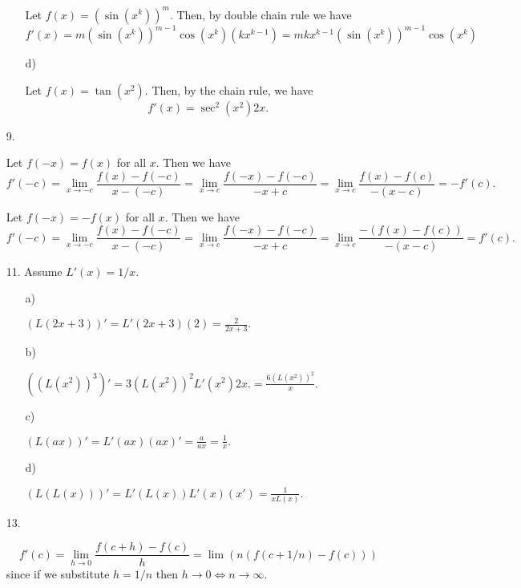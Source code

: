 \documentclass[letter paper, 11pt]{article}
\begin{document}
\begin{itemize}
\begin{itemize}
            Let $f(x) = (\sin(x^k))^m$. Then, by double chain rule we have $$f'(x) = m(\sin(x^k))^{m-1}\cos(x^k)(kx^{k-1}) = mkx^{k-1}(\sin(x^k))^{m-1}\cos(x^k) $$
        
        \item[d)]
        
            Let $f(x) = \tan(x^2)$. Then, by the chain rule, we have $$f'(x) = \sec^2(x^2)2x.$$
        
    \end{itemize}
    
    \item[9.]
    
        Let $f(-x) = f(x)$ for all $x$. Then we have $$f'(-c) = \lim_{x \rightarrow -c}\frac{f(x) - f(-c)}{x-(-c)} = \lim_{x\rightarrow c}\frac{f(-x) - f(-c)}{-x + c} = \lim_{x\rightarrow c}\frac{f(x)-f(c)}{-(x-c)} = -f'(c).$$
    
        Let $f(-x) = -f(x)$ for all $x$. Then we have $$f'(-c) = \lim_{x \rightarrow -c}\frac{f(x) - f(-c)}{x-(-c)} = \lim_{x\rightarrow c}\frac{f(-x) - f(-c)}{-x + c} = \lim_{x\rightarrow c}\frac{-(f(x)-f(c))}{-(x-c)} = f'(c).$$
    
    \item[11.] Assume $L'(x) = 1/x$.
    \begin{itemize}
        \item[a)]
        
            $(L(2x+3))' = L'(2x+3)(2) = \frac{2}{2x+3}.$
        
        \item[b)]
        
            $((L(x^2))^3)' = 3(L(x^2))^2L'(x^2)2x. = \frac{6(L(x^2))^2}{x}.$
        
        \item[c)]
        
            $(L(ax))' = L'(ax)(ax)' = \frac{a}{ax} = \frac{1}{x}.$
        
        \item[d)]
        
            $(L(L(x)))' = L'(L(x))L'(x)(x') = \frac{1}{xL(x)}.$
        
    \end{itemize}
    
    \item[13.]
    
        $$f'(c) = \lim_{h \rightarrow 0}\frac{f(c+h)-f(c)}{h} = \lim(n(f(c+1/n)-f(c)))$$ since if we substitute $h = 1/n$ then $h\rightarrow 0 \Leftrightarrow n\rightarrow\infty$.
        

\end{itemize}
\end{document}
